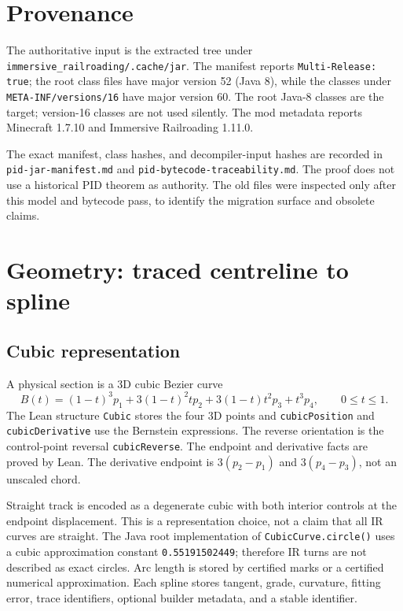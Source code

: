 \documentclass[10pt,a4paper]{article}
\newcommand{\Lean}[1]{\texttt{#1}}
\begin{document}
\section{Provenance}

The authoritative input is the extracted tree under
\texttt{immersive\_railroading/.cache/jar}.  The manifest reports
\texttt{Multi-Release: true}; the root class files have major version 52
(Java 8), while the classes under \texttt{META-INF/versions/16} have major
version 60.  The root Java-8 classes are the target; version-16 classes are not
used silently.  The mod metadata reports Minecraft 1.7.10 and Immersive
Railroading 1.11.0.

The exact manifest, class hashes, and decompiler-input hashes are recorded in
\texttt{pid-jar-manifest.md} and
\texttt{pid-bytecode-traceability.md}.  The proof does not use a historical
PID theorem as authority.  The old files were inspected only after this model
and bytecode pass, to identify the migration surface and obsolete claims.

\section{Geometry: traced centreline to spline}

\subsection{Cubic representation}

A physical section is a 3D cubic Bezier curve
\[
 B(t)=(1-t)^3p_1+3(1-t)^2tp_2+3(1-t)t^2p_3+t^3p_4,
 \qquad 0\leq t\leq 1.
\]
The Lean structure \Lean{Cubic} stores the four 3D points and
\Lean{cubicPosition} and \Lean{cubicDerivative} use the Bernstein
expressions.  The reverse orientation is the control-point reversal
\Lean{cubicReverse}.  The endpoint and derivative facts are proved by Lean.
The derivative endpoint is $3(p_2-p_1)$ and $3(p_4-p_3)$, not an unscaled
chord.

Straight track is encoded as a degenerate cubic with both interior controls at
the endpoint displacement.  This is a representation choice, not a claim
that all IR curves are straight.  The Java root implementation of
\texttt{CubicCurve.circle()} uses a cubic approximation constant
\texttt{0.55191502449}; therefore IR turns are not described as exact
circles.  Arc length is stored by certified marks or a certified numerical
approximation.  Each spline stores tangent, grade, curvature, fitting error,
trace identifiers, optional builder metadata, and a stable identifier.
\end{document}
